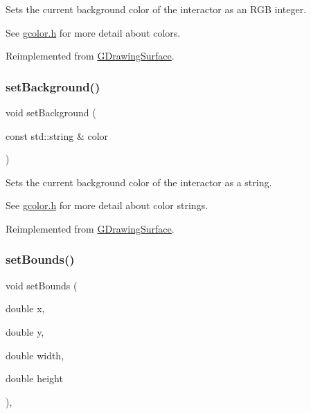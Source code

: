 Sets the current background color of the interactor as an R\+GB integer. 

See \mbox{\hyperlink{gcolor_8h_source}{gcolor.\+h}} for more detail about colors. 

Reimplemented from \mbox{\hyperlink{classGDrawingSurface_aba673fd56570a074aba10fa059524b96}{G\+Drawing\+Surface}}.

\mbox{\label{classGCanvas_a222fcfb542aa6094c7e0de671bd69627}} 
\subsubsection{\texorpdfstring{set\+Background()}{setBackground()}\hspace{0.1cm}{\footnotesize\ttfamily [2/2]}}
{\footnotesize\ttfamily void set\+Background (\begin{DoxyParamCaption}\item[{const std\+::string \&}]{color }\end{DoxyParamCaption})\hspace{0.3cm}{\ttfamily [virtual]}}



Sets the current background color of the interactor as a string. 

See \mbox{\hyperlink{gcolor_8h_source}{gcolor.\+h}} for more detail about color strings. 

Reimplemented from \mbox{\hyperlink{classGDrawingSurface_ab4677ab2474e68b07aa56605af92a84a}{G\+Drawing\+Surface}}.

\mbox{\label{classGInteractor_a2aae8197624b72265ab83b4f1bc73f2f}} 
\subsubsection{\texorpdfstring{set\+Bounds()}{setBounds()}\hspace{0.1cm}{\footnotesize\ttfamily [1/2]}}
{\footnotesize\ttfamily void set\+Bounds (\begin{DoxyParamCaption}\item[{double}]{x,  }\item[{double}]{y,  }\item[{double}]{width,  }\item[{double}]{height }\end{DoxyParamCaption})\hspace{0.3cm}{\ttfamily [virtual]}, {\ttfamily [inherited]}}



